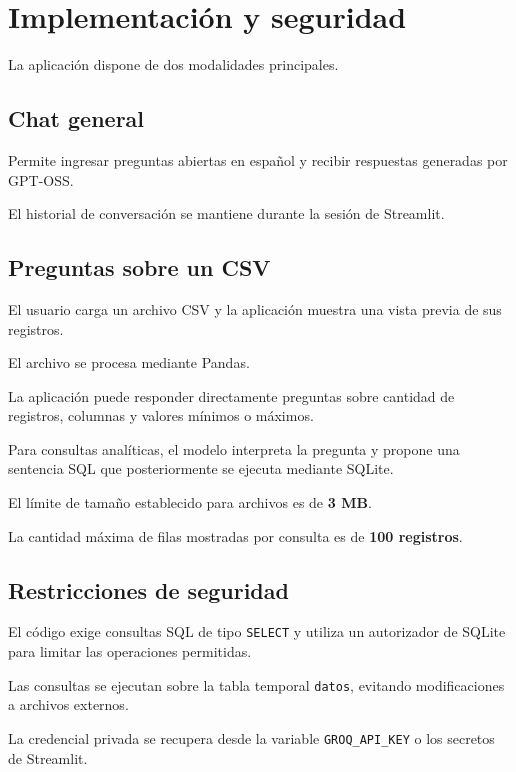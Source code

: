 \documentclass[11pt,a4paper]{article}
\begin{document}
\section{Implementación y seguridad}

La aplicación dispone de dos modalidades principales.

\subsection{Chat general}

Permite ingresar preguntas abiertas en español
y recibir respuestas generadas por GPT-OSS.

El historial de conversación se mantiene durante
la sesión de Streamlit.

\subsection{Preguntas sobre un CSV}

El usuario carga un archivo CSV y la aplicación
muestra una vista previa de sus registros.

El archivo se procesa mediante Pandas.

La aplicación puede responder directamente preguntas
sobre cantidad de registros, columnas y valores
mínimos o máximos.

Para consultas analíticas, el modelo interpreta
la pregunta y propone una sentencia SQL que
posteriormente se ejecuta mediante SQLite.

El límite de tamaño establecido para archivos
es de \textbf{3 MB}.

La cantidad máxima de filas mostradas por consulta
es de \textbf{100 registros}.

\subsection{Restricciones de seguridad}

El código exige consultas SQL de tipo
\texttt{SELECT} y utiliza un autorizador de SQLite
para limitar las operaciones permitidas.

Las consultas se ejecutan sobre la tabla temporal
\texttt{datos}, evitando modificaciones a
archivos externos.

La credencial privada se recupera desde la variable
\texttt{GROQ\_API\_KEY} o los secretos de Streamlit.
\end{document}
